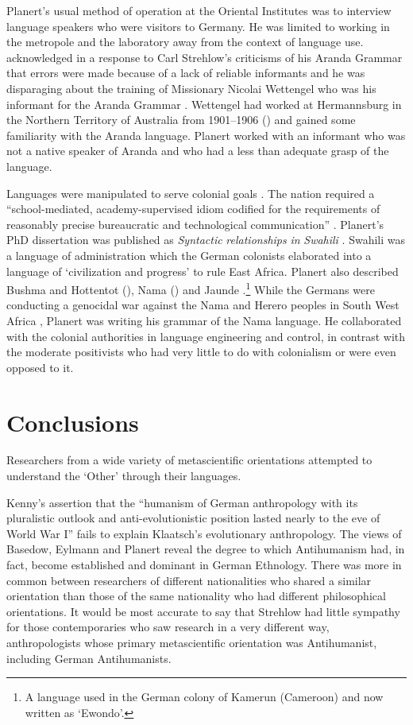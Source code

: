 \documentclass[english,output=paper,colorlinks,citecolor=brown]{../langscibook}
\begin{document}
Planert’s usual method of operation at the Oriental Institutes was to interview language speakers who were visitors to Germany. He was limited to working in the metropole and the laboratory away from the context of language use. \citet{Planert1908} acknowledged in a response to Carl Strehlow’s criticisms of his Aranda Grammar that errors were made because of a lack of reliable informants and he was disparaging about the training of Missionary Nicolai Wettengel who was his informant for the Aranda Grammar \citep{Planert1907Aranda}.  Wettengel had worked at Hermannsburg in the Northern Territory of Australia from 1901--1906 (\citealt[1154]{Strehlow2011}) and gained some familiarity with the Aranda language. Planert worked with an informant who was not a native speaker of Aranda and who had a less than adequate grasp of the language. 

Languages were manipulated to serve colonial goals \citep[88]{Errington2008}. The nation required a “school-mediated, academy-supervised idiom codified for the requirements of reasonably precise bureaucratic and technological communication” \citep[57]{Gellner1983}. Planert’s PhD dissertation was published as \textit{Syntactic} \textit{relationships} \textit{in} \textit{Swahili} \citep{Planert1907Suaheli}. Swahili was a language of administration which the German colonists elaborated into a language of ‘civilization and progress’ to rule East Africa. Planert also described Bushma and Hottentot (\citeyear{Planert1905}), Nama (\citeyear{Planert1905}) and Jaunde \citep{Nekes1911}.\footnote{A language used in the German colony of Kamerun (Cameroon) and now written as ‘Ewondo’.} While the Germans were conducting a genocidal war against the Nama and Herero peoples in South West Africa \citep{Hull2005}, Planert was writing his grammar of the Nama language. He collaborated with the colonial authorities in language engineering and control, in contrast with the moderate positivists who had very little to do with colonialism or were even opposed to it. 

\section{Conclusions} 

Researchers from a wide variety of metascientific orientations attempted to understand the ‘Other’ through their languages. 

Kenny’s assertion that the ``humanism of German anthropology with its pluralistic outlook and anti-evolutionistic position lasted nearly to the eve of World War I'' fails to explain Klaatsch’s evolutionary anthropology. The views of Basedow, Eylmann and Planert reveal the degree to which Antihumanism had, in fact, become established and dominant in German Ethnology. There was more in common between researchers of different nationalities who shared a similar orientation than those of the same nationality who had different philosophical orientations.  It would be most accurate to say that Strehlow had little sympathy for those contemporaries who saw research in a very different way, anthropologists whose primary metascientific orientation was Antihumanist, including German Antihumanists. 
\end{document}
